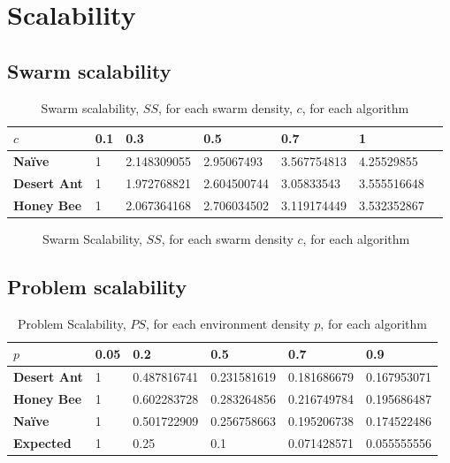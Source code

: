 \section{Scalability}
\label{results:scalability}

\subsection{Swarm scalability}
\begin{table}[]
\centering
\caption{Swarm scalability, $SS$, for each swarm density, $c$, for each algorithm}
\label{table:swarmscalability}
\begin{tabular}{@{}lllllll@{}}
\toprule
\textbf{$c$}            & \textbf{0.1} & \textbf{0.3}         & \textbf{0.5}         & \textbf{0.7}         & \textbf{1}           \\ \midrule
\textbf{Na\"ive}    & 1   & 2.148309055 & 2.95067493  & 3.567754813 & 4.25529855  \\
\textbf{Desert Ant} & 1   & 1.972768821 & 2.604500744 & 3.05833543  & 3.555516648 \\
\textbf{Honey Bee}  & 1   & 2.067364168 & 2.706034502 & 3.119174449 & 3.532352867 \\ \bottomrule
\end{tabular}
\end{table}

\begin{figure}[!htb]
\centering
\small
\resizebox{\textwidth}{!}{}
\caption{Swarm Scalability, $SS$, for each swarm density $c$, for each algorithm}
\label{fig:swarmscalability}
\end{figure}


\subsection{Problem scalability}


\begin{table}[]
\centering
\caption{Problem Scalability, $PS$, for each environment density $p$, for each algorithm}
\label{table:problemscalability}
\begin{tabular}{@{}llllll@{}}
\toprule
\textbf{$p$}                  & \textbf{0.05} & \textbf{0.2        } & \textbf{0.5}         & \textbf{0.7}         & \textbf{0.9}         \\ \midrule
\textbf{Desert Ant}           & 1    & 0.487816741 & 0.231581619 & 0.181686679 & 0.167953071 \\
\textbf{Honey Bee}            & 1    & 0.602283728 & 0.283264856 & 0.216749784 & 0.195686487 \\
\textbf{Na\"ive}              & 1    & 0.501722909 & 0.256758663 & 0.195206738 & 0.174522486 \\
\textbf{Expected} & 1    & 0.25        & 0.1         & 0.071428571 & 0.055555556 \\ \bottomrule
\end{tabular}
\end{table}

